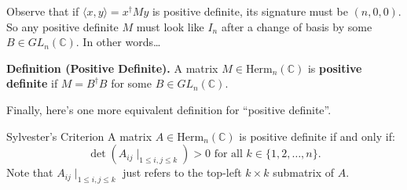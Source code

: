 Observe that if $\langle x, y \rangle = x^{\dagger}My$ is positive definite, its signature must be $(n, 0, 0)$.  So any positive definite $M$ must look like $I_n$ after a change of basis by some $B \in GL_n(\mathbb{C})$.  In other words\dots

\textbf{Definition (Positive Definite).} A matrix $M \in \mathrm{Herm}_n(\mathbb{C})$ is \textbf{positive definite} if $M = B^{\dagger}B$ for some $B \in GL_n(\mathbb{C})$.

Finally, here's one more equivalent definition for ``positive definite''.

\begin{theorem}{Sylvester's Criterion}
    A matrix $A \in \mathrm{Herm}_n(\mathbb{C})$ is positive definite if and only if:
    \[ \det(A_{ij} \mid _{1 \leq i, j \leq k}) > 0 \text{ for all } k \in \{1, 2, \dots, n\}. \]
    Note that $A_{ij} \mid _{1 \leq i, j \leq k}$ just refers to the top-left $k \times k$ submatrix of $A$. 
\end{theorem}

